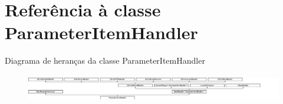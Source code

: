 \hypertarget{class_parameter_item_handler}{\section{Referência à classe Parameter\-Item\-Handler}
\label{class_parameter_item_handler}
}
Diagrama de heranças da classe Parameter\-Item\-Handler\begin{figure}[H]
\begin{center}
\leavevmode
\includegraphics[height=1.245136cm]{class_parameter_item_handler}
\end{center}
\end{figure}
